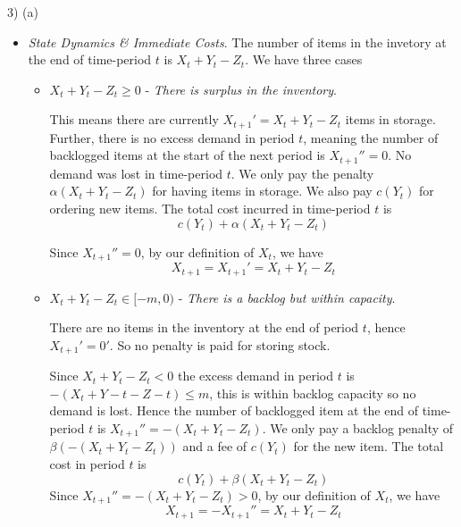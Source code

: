 \documentclass[11pt,a4paper]{article}
\begin{document}
\begin{answer}{3) (a)}
\begin{itemize}
    \item \textit{State Dynamics \& Immediate Costs}.
    The number of items in the invetory at the end of time-period $t$ is $X_t+Y_t-Z_t$.
    We have three cases
    \begin{itemize}
      \item $X_t+Y_t-Z_t\geq0$ - \textit{There is surplus in the inventory}.
      \par This means there are currently $X_{t+1}'=X_t+Y_t-Z_t$ items in storage. Further, there is no excess demand in period $t$, meaning the number of backlogged items at the start of the next period is $X_{t+1}''=0$. No demand was lost in time-period $t$.  We only pay the penalty $\alpha(X_t+Y_t-Z_t)$ for having items in storage. We also pay $c(Y_t)$ for ordering new items. The total cost incurred in time-period $t$ is
      \[ c(Y_t)+\alpha(X_t+Y_t-Z_t) \]
      \par Since $X_{t+1}''=0$, by our definition of $X_t$, we have
      \[ X_{t+1}=X_{t+1}'=X_t+Y_t-Z_t \]

      \item $X_t+Y_t-Z_t\in[-m,0)$ - \textit{There is a backlog but within capacity}.
      \par There are no items in the inventory at the end of period $t$, hence $X_{t+1}'=0'$. So no penalty is paid for storing stock.
      \par Since $X_t+Y_t-Z_t<0$ the excess demand in period $t$ is $-(X_t+Y-t-Z-t)\leq m$, this is within backlog capacity so no demand is lost. Hence the number of backlogged item at the end of time-period $t$ is $X_{t+1}''=-(X_t+Y_t-Z_t)$. We only pay a backlog penalty of $\beta(-(X_t+Y_t-Z_t))$ and a fee of $c(Y_t)$ for the new item. The total cost in period $t$ is
      \[ c(Y_t)+\beta(X_t+Y_t-Z_t) \]
      Since $X_{t+1}''=-(X_t+Y_t-Z_t)>0$, by our definition of $X_t$, we have
      \[ X_{t+1}=-X_{t+1}''=X_t+Y_t-Z_t \]


\end{itemize}
\end{itemize}
\end{answer}
\end{document}
